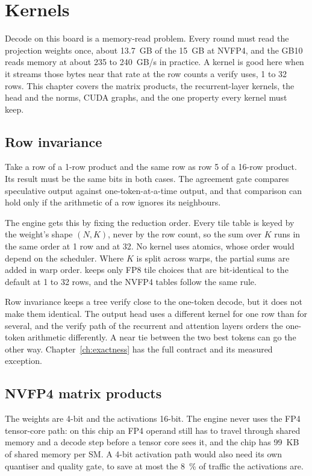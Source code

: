 \chapter{Kernels}\label{ch:kernels}

Decode on this board is a memory-read problem. Every round must read the projection weights once, about 13.7~GB of the 15~GB at NVFP4, and the GB10 reads memory at about 235 to 240~GB/s in practice. A kernel is good here when it streams those bytes near that rate at the row counts a verify uses, 1 to 32 rows. This chapter covers the matrix products, the recurrent-layer kernels, the head and the norms, CUDA graphs, and the one property every kernel must keep.

\section{Row invariance}

Take a row of a 1-row product and the same row as row 5 of a 16-row product. Its result must be the same bits in both cases. The agreement gate compares speculative output against one-token-at-a-time output, and that comparison can hold only if the arithmetic of a row ignores its neighbours.

The engine gets this by fixing the reduction order. Every tile table is keyed by the weight's shape $(N, K)$, never by the row count, so the sum over $K$ runs in the same order at 1 row and at 32. No kernel uses atomics, whose order would depend on the scheduler. Where $K$ is split across warps, the partial sums are added in warp order.  keeps only FP8 tile choices that are bit-identical to the default at 1 to 32 rows, and the NVFP4 tables follow the same rule.

Row invariance keeps a tree verify close to the one-token decode, but it does not make them identical. The output head uses a different kernel for one row than for several, and the verify path of the recurrent and attention layers orders the one-token arithmetic differently. A near tie between the two best tokens can go the other way. Chapter~\ref{ch:exactness} has the full contract and its measured exception.

\section{NVFP4 matrix products}

The weights are 4-bit and the activations 16-bit. The engine never uses the FP4 tensor-core path: on this chip an FP4 operand still has to travel through shared memory and a decode step before a tensor core sees it, and the chip has 99~KB of shared memory per SM. A 4-bit activation path would also need its own quantiser and quality gate, to save at most the 8~\% of traffic the activations are.

